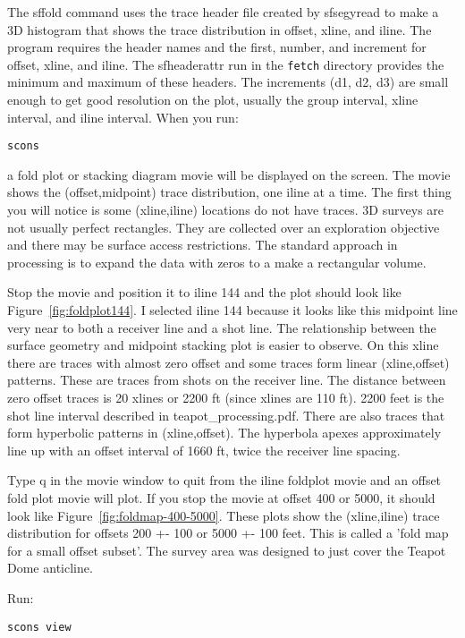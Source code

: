 The sffold command uses the trace header file created by sfsegyread to make a 3D histogram that shows the trace distribution in offset, xline, and iline.  The program requires the header names and the first, number, and increment for offset, xline, and iline.  The sfheaderattr run in the \texttt{fetch} directory provides the minimum and maximum of these headers.  The increments (d1, d2, d3) are small enough to get good resolution on the plot, usually the group interval, xline interval, and iline interval.  When you run:
\begin{verbatim}  
scons
\end{verbatim}  

a fold plot or stacking diagram movie will be displayed on the screen.  The movie shows the (offset,midpoint) trace distribution, one iline at a time. The first thing you will notice is some (xline,iline) locations do not have traces.  3D surveys are not usually perfect rectangles.  They are collected over an exploration objective and there may be surface access restrictions.  The standard approach in processing is to expand the data with zeros to a make a rectangular volume.

Stop the movie and position it to iline 144 and the plot should look like Figure~\ref{fig:foldplot144}.  I selected iline 144 because it looks like this midpoint line very near to both a receiver line and a shot line.   The relationship between the surface geometry and midpoint stacking plot is easier to observe.  On this xline there are traces with almost zero offset and some traces form linear (xline,offset) patterns.  These are traces from shots on the receiver line.  The distance between zero offset traces is 20 xlines or 2200 ft (since xlines are 110 ft).  2200 feet is the shot line interval described in teapot\_processing.pdf.  There are also traces that form hyperbolic patterns in (xline,offset).  The hyperbola apexes approximately line up with an offset interval of 1660 ft, twice the receiver line spacing.

Type q in the movie window to quit from the iline foldplot movie and an offset fold plot movie will plot.  If you stop the movie at offset 400 or 5000, it should look like Figure~\ref{fig:foldmap-400-5000}.  These plots show the (xline,iline) trace distribution for offsets 200 +- 100 or 5000 +- 100 feet.  This is called a 'fold map for a small offset subset'.  The survey area was designed to just cover the Teapot Dome anticline.

Run:
\begin{verbatim}   
scons view
\end{verbatim}

